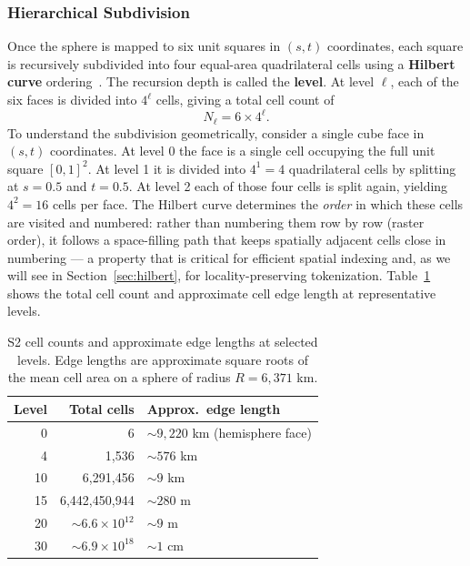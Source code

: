 \documentclass{book}
\begin{document}
\subsubsection{Hierarchical Subdivision}

Once the sphere is mapped to six unit squares in $(s, t)$ coordinates,
each square is recursively subdivided into four equal-area quadrilateral
cells using a \textbf{Hilbert curve} ordering~\cite{hilbert1891,s2geometry}.
The recursion depth is called the \textbf{level}.  At level $\ell$,
each of the six faces is divided into $4^\ell$ cells, giving a total
cell count of
\begin{equation}
  N_\ell = 6 \times 4^\ell.
  \label{eq:s2_cell_count}
\end{equation}
To understand the subdivision geometrically, consider a single cube
face in $(s, t)$ coordinates.  At level 0 the face is a single cell
occupying the full unit square $[0,1]^2$.  At level 1 it is divided
into $4^1 = 4$ quadrilateral cells by splitting at $s = 0.5$ and
$t = 0.5$.  At level 2 each of those four cells is split again,
yielding $4^2 = 16$ cells per face.  The Hilbert curve determines the
\emph{order} in which these cells are visited and numbered: rather
than numbering them row by row (raster order), it follows a
space-filling path that keeps spatially adjacent cells close in
numbering --- a property that is critical for efficient spatial
indexing and, as we will see in Section~\ref{sec:hilbert}, for
locality-preserving tokenization.  Table~\ref{tab:s2_levels} shows
the total cell count and approximate cell edge length at
representative levels.

\begin{table}[htbp]
  \centering
  \caption{S2 cell counts and approximate edge lengths at selected levels.
           Edge lengths are approximate square roots of the mean cell area
           on a sphere of radius $R = 6{,}371$ km.}
  \label{tab:s2_levels}
  \begin{tabular}{rrl}
    \hline
    \textbf{Level} & \textbf{Total cells} & \textbf{Approx.\ edge length} \\
    \hline
     0 &                      6 & $\sim 9{,}220$ km (hemisphere face) \\
     4 &                  1,536 & $\sim 576$ km                       \\
    10 &          6,291,456     & $\sim 9$ km                         \\
    15 &      6,442,450,944     & $\sim 280$ m                        \\
    20 & $\sim 6.6 \times 10^{12}$ & $\sim 9$ m                      \\
    30 & $\sim 6.9 \times 10^{18}$ & $\sim 1$ cm                     \\
    \hline
  \end{tabular}
\end{table}
\end{document}
